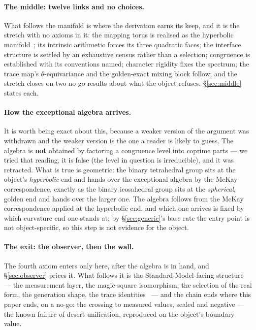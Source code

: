 \documentclass[11pt,a4paper]{article}
\theoremstyle{definition}
\theoremstyle{remark}
\begin{document}
\paragraph{The middle: twelve links and no choices.} What follows the manifold is where the
derivation earns its keep, and it is the stretch with no axioms in it: the mapping torus is realised as the hyperbolic manifold~\cite{thurston}; its intrinsic arithmetic forces its three quadratic faces; the interface structure is
settled by an exhaustive census rather than a selection; congruence is established with its
conventions named; character rigidity fixes the spectrum; the trace map's $\theta$-equivariance and the golden-exact mixing
block follow; and the stretch closes on two no-go results about what the object refuses. \S\ref{sec:middle} states each.

\paragraph{How the exceptional algebra arrives.} It is worth being exact about this, because a
weaker version of the argument was withdrawn and the weaker version is the one a reader is likely to
guess. The algebra is \textbf{not} obtained by factoring a congruence level into coprime parts --- we
tried that reading, it is false (the level in question is irreducible), and it was retracted. What is
true is geometric: the binary tetrahedral group sits at the object's \emph{hyperbolic} end and hands
over the exceptional algebra by the McKay correspondence, exactly as the binary icosahedral group
sits at the \emph{spherical}, golden end and hands over the larger one. The algebra follows from the McKay correspondence applied at the hyperbolic end, and which one arrives is fixed by
which curvature end one stands at; by \S\ref{sec:generic}'s base rate the entry point is not object-specific, so
this step is not evidence for the object.

\paragraph{The exit: the observer, then the wall.} The fourth axiom enters only here, after the
algebra is in hand, and \S\ref{sec:observer} prices it. What follows it is the Standard-Model-facing
structure --- the measurement layer, the magic-square isomorphism, the selection of the real form,
the generation shape, the trace identities~\cite{fricke} --- and the chain ends where this paper ends, on a no-go:
the crossing to measured values, sealed and negative --- the known failure of desert unification, reproduced on the
object's boundary value.
\end{document}
